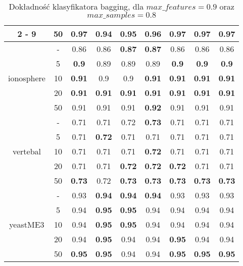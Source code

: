 \begin{table}[H]
\begin{center}
{\begin{tabular}{c|c|ccccccc}
				\cline{2%
					-%
					9}%
				&50&\textbf{0.97}&0.94&0.95&0.96&\textbf{0.97}&\textbf{0.97}&\textbf{0.97}\\%
				\hline%
				\multirow{5}{*}{ionosphere}&{-}&0.86&0.86&\textbf{0.87}&\textbf{0.87}&0.86&0.86&0.86\\%
				\cline{2%
					-%
					9}%
				&5&\textbf{0.9}&0.89&0.89&0.89&\textbf{0.9}&\textbf{0.9}&\textbf{0.9}\\%
				\cline{2%
					-%
					9}%
				&10&\textbf{0.91}&0.9&0.9&\textbf{0.91}&\textbf{0.91}&\textbf{0.91}&\textbf{0.91}\\%
				\cline{2%
					-%
					9}%
				&20&\textbf{0.91}&\textbf{0.91}&\textbf{0.91}&\textbf{0.91}&\textbf{0.91}&\textbf{0.91}&\textbf{0.91}\\%
				\cline{2%
					-%
					9}%
				&50&0.91&0.91&0.91&\textbf{0.92}&0.91&0.91&0.91\\%
				\hline%
				\multirow{5}{*}{vertebal}&{-}&0.71&0.71&0.72&\textbf{0.73}&0.71&0.71&0.71\\%
				\cline{2%
					-%
					9}%
				&5&0.71&\textbf{0.72}&0.71&0.71&0.71&0.71&0.71\\%
				\cline{2%
					-%
					9}%
				&10&0.71&0.71&0.71&\textbf{0.72}&0.71&0.71&0.71\\%
				\cline{2%
					-%
					9}%
				&20&0.71&0.71&\textbf{0.72}&\textbf{0.72}&\textbf{0.72}&0.71&0.71\\%
				\cline{2%
					-%
					9}%
				&50&\textbf{0.73}&0.72&\textbf{0.73}&\textbf{0.73}&\textbf{0.73}&\textbf{0.73}&\textbf{0.73}\\%
				\hline%
				\multirow{5}{*}{yeastME3}&{-}&0.93&\textbf{0.94}&\textbf{0.94}&\textbf{0.94}&0.93&0.93&0.93\\%
				\cline{2%
					-%
					9}%
				&5&0.94&\textbf{0.95}&\textbf{0.95}&0.94&0.94&0.94&0.94\\%
				\cline{2%
					-%
					9}%
				&10&0.94&\textbf{0.95}&\textbf{0.95}&0.94&0.94&0.94&0.94\\%
				\cline{2%
					-%
					9}%
				&20&0.94&\textbf{0.95}&0.94&0.94&\textbf{0.95}&0.94&0.94\\%
				\cline{2%
					-%
					9}%
				&50&\textbf{0.95}&\textbf{0.95}&0.94&0.94&\textbf{0.95}&\textbf{0.95}&\textbf{0.95}\\%
				\hline%
			\end{tabular}}
			\caption{Dokładność klasyfikatora bagging, dla $max\_features = 0.9$ oraz $max\_samples = 0.8$}
			\label{baggingdrzewoacc2}
		\end{center}
	\end{table}
	
